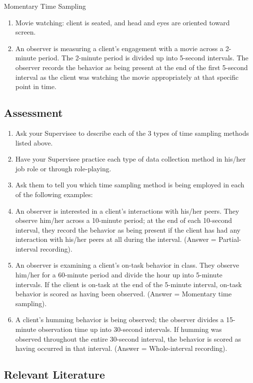 Momentary Time Sampling\\
\begin{enumerate}
\item Movie watching: client is seated, and head and eyes are oriented toward screen.
\item An observer is measuring a client's engagement with a movie across a 2-minute period. The 2-minute period is divided up into 5-second intervals. The observer records the behavior as being present at the end of the first 5-second interval as the client was watching the movie appropriately at that specific point in time. 
\end{enumerate}
%
\subsection{Assessment}
\begin{enumerate}
\item Ask your Supervisee to describe each of the 3 types of time sampling methods listed above.
\item Have your Supervisee practice each type of data collection method in his/her job role or through role-playing.
\item Ask them to tell you which time sampling method is being employed in each of the following examples:
\item An observer is interested in a client's interactions with his/her peers. They observe him/her across a 10-minute period; at the end of each 10-second interval, they record the behavior as being present if the client has had any interaction with his/her peers at all during the interval. (Answer = Partial-interval recording).
\item An observer is examining a client's on-task behavior in class. They observe him/her for a 60-minute period and divide the hour up into 5-minute intervals. If the client is on-task at the end of the 5-minute interval, on-task behavior is scored as having been observed. (Answer = Momentary time sampling). 
\item A client's humming behavior is being observed; the observer divides a 15-minute observation time up into 30-second intervals. If humming was observed throughout the entire 30-second interval, the behavior is scored as having occurred in that interval. (Answer = Whole-interval recording). 
\end{enumerate}
%
\subsection{Relevant Literature}
\begin{refsection}
\nocite{cooper2007applied,
    meany2007comparison,
    powell1975evaluation,
    suen1991reappraisal}
\printbibliography[heading=none]
\end{refsection}
%
